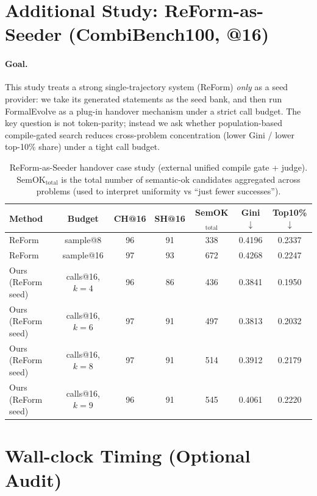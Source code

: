 \documentclass[10pt]{article}
\begin{document}
\section{Additional Study: ReForm-as-Seeder (CombiBench100, @16)}

\paragraph{Goal.}
This study treats a strong single-trajectory system (ReForm) \emph{only} as a seed provider: we take its generated statements as the seed bank, and then run FormalEvolve as a plug-in handover mechanism under a strict call budget.
The key question is not token-parity; instead we ask whether population-based compile-gated search reduces cross-problem concentration (lower Gini / lower top-10\% share) under a tight call budget.

\begin{table}[h]
  \centering
  \caption{ReForm-as-Seeder handover case study (external unified compile gate + judge). SemOK$_{\mathrm{total}}$ is the total number of semantic-ok candidates aggregated across problems (used to interpret uniformity vs ``just fewer successes'').}
  \label{tab:supp-reform-seeder}
  \scriptsize
  \setlength{\tabcolsep}{5pt}
  \begin{tabular}{lcccccc}
    \toprule
    Method & Budget & CH@16 & SH@16 & SemOK$_\text{total}$ & Gini$\downarrow$ & Top10\%$\downarrow$ \\
    \midrule
    ReForm & sample@8  & 96 & 91 & 338 & 0.4196 & 0.2337 \\
    ReForm & sample@16 & 97 & 93 & 672 & 0.4268 & 0.2247 \\
    \midrule
    Ours (ReForm seed) & calls@16, $k{=}4$ & 96 & 86 & 436 & 0.3841 & 0.1950 \\
    Ours (ReForm seed) & calls@16, $k{=}6$ & 97 & 91 & 497 & 0.3813 & 0.2032 \\
    Ours (ReForm seed) & calls@16, $k{=}8$ & 97 & 91 & 514 & 0.3912 & 0.2179 \\
    Ours (ReForm seed) & calls@16, $k{=}9$ & 96 & 91 & 545 & 0.4061 & 0.2220 \\
    \bottomrule
  \end{tabular}
\end{table}

\section{Wall-clock Timing (Optional Audit)}
\end{document}
